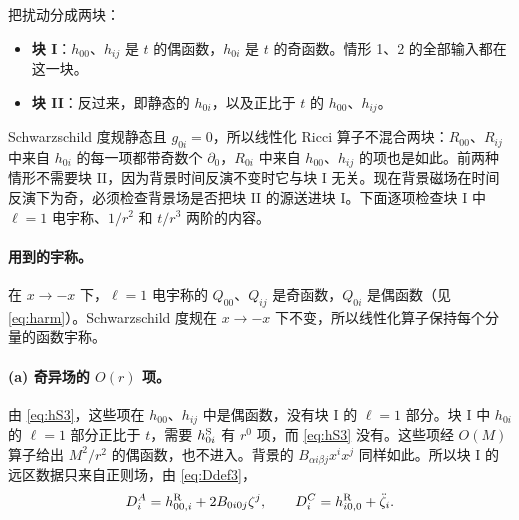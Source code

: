 \documentclass[11pt,a4paper]{ctexart}
\numberwithin{equation}{section}
\begin{document}
把扰动分成两块：
\begin{itemize}
\item \textbf{块 I}：$h_{00}$、$h_{ij}$ 是 $t$ 的偶函数，$h_{0i}$ 是 $t$ 的奇函数。情形 1、2 的全部输入都在这一块。
\item \textbf{块 II}：反过来，即静态的 $h_{0i}$，以及正比于 $t$ 的 $h_{00}$、$h_{ij}$。
\end{itemize}
Schwarzschild 度规静态且 $g_{0i}=0$，所以线性化 Ricci 算子不混合两块：$R_{00}$、$R_{ij}$ 中来自 $h_{0i}$ 的每一项都带奇数个 $\partial_0$，$R_{0i}$ 中来自 $h_{00}$、$h_{ij}$ 的项也是如此。前两种情形不需要块 II，因为背景时间反演不变时它与块 I 无关。现在背景磁场在时间反演下为奇，必须检查背景场是否把块 II 的源送进块 I。下面逐项检查块 I 中 $\ell=1$ 电宇称、$1/r^2$ 和 $t/r^3$ 两阶的内容。

\paragraph{用到的宇称。}在 $x\to-x$ 下，$\ell=1$ 电宇称的 $Q_{00}$、$Q_{ij}$ 是奇函数，$Q_{0i}$ 是偶函数（见 \eqref{eq:harm}）。Schwarzschild 度规在 $x\to-x$ 下不变，所以线性化算子保持每个分量的函数宇称。

\paragraph{(a) 奇异场的 $O(r)$ 项。}由 \eqref{eq:hS3}，这些项在 $h_{00}$、$h_{ij}$ 中是偶函数，没有块 I 的 $\ell=1$ 部分。块 I 中 $h_{0i}$ 的 $\ell=1$ 部分正比于 $t$，需要 $h^{\rm S}_{0i}$ 有 $r^0$ 项，而 \eqref{eq:hS3} 没有。这些项经 $O(M)$ 算子给出 $M^2/r^2$ 的偶函数，也不进入。背景的 $B_{\alpha i\beta j}x^ix^j$ 同样如此。所以块 I 的远区数据只来自正则场，由 \eqref{eq:Ddef3}，
\begin{equation}
D^A_i=h^{\rm R}_{00,i}+2B_{0i0j}\zeta^j,\qquad D^C_i=h^{\rm R}_{i0,0}+\ddot\zeta_i .
\label{eq:DAC3}
\end{equation}
\end{document}
